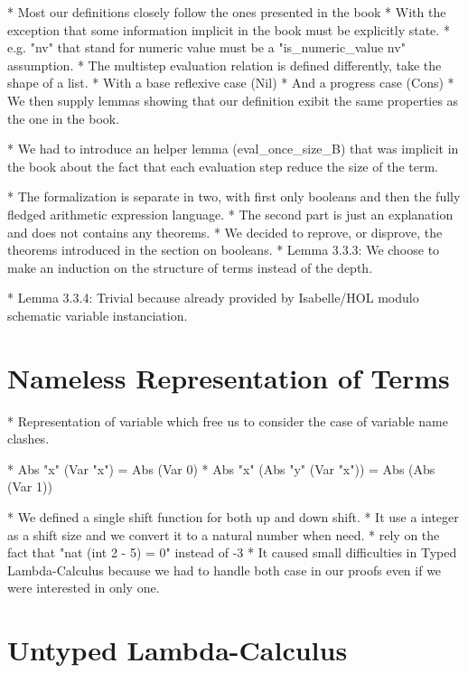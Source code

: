 \documentclass[a4paper, oneside, 12pt, titlepage]{article}
\begin{document}
  * Most our definitions closely follow the ones presented in the book
    * With the exception that some information implicit in the book must be explicitly state.
      * e.g. "nv" that stand for numeric value must be a "is\_numeric\_value nv" assumption.
    * The multistep evaluation relation is defined differently, take the shape of a list.
      * With a base reflexive case (Nil)
      * And a progress case (Cons)
      * We then supply lemmas showing that our definition exibit the same properties as the one in
        the book.

  * We had to introduce an helper lemma (eval\_once\_size\_B) that was implicit in the book about the
    fact that each evaluation step reduce the size of the term.

  * The formalization is separate in two, with first only booleans and then the fully fledged
    arithmetic expression language.
    * The second part is just an explanation and does not contains any theorems.
      * We decided to reprove, or disprove, the theorems introduced in the section on booleans.
  * Lemma 3.3.3: We choose to make an induction on the structure of terms instead of the depth.

  * Lemma 3.3.4: Trivial because already provided by Isabelle/HOL modulo schematic variable
    instanciation.

\section{Nameless Representation of Terms}
\label{sec:nameless-rep-of-terms}

  * Representation of variable which free us to consider the case of variable name clashes.

  * Abs "x" (Var "x") = Abs (Var 0)
  * Abs "x" (Abs "y" (Var "x")) = Abs (Abs (Var 1))

  * We defined a single shift function for both up and down shift.
    * It use a integer as a shift size and we convert it to a natural number when need.
      * rely on the fact that "nat (int 2 - 5) = 0" instead of -3
    * It caused small difficulties in Typed Lambda-Calculus because we had to handle both case in
      our proofs even if we were interested in only one.

\section{Untyped Lambda-Calculus}
\label{sec:untyped-lambda-calculus}
\end{document}
